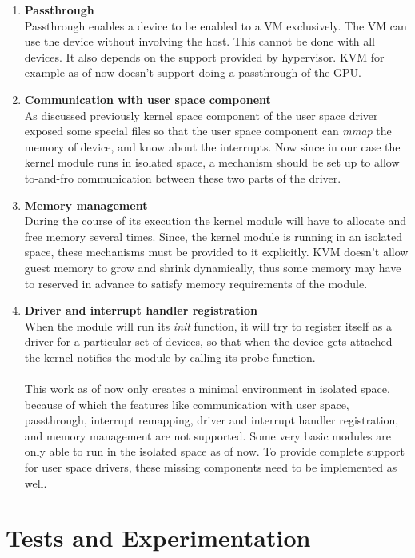 \documentclass[twoside]{iitbreport}
\begin{document}
\begin{enumerate}
\item \textbf{Passthrough}\\
Passthrough enables a device to be enabled to a VM exclusively. The VM can use the device without involving the host. This cannot be done with all devices. It also depends on the support provided by hypervisor. KVM for example as of now doesn't support doing a passthrough of the GPU.
\item \textbf{Communication with user space component}\\
As discussed previously kernel space component of the user space driver exposed some special files so that the user space component can \textit{mmap} the memory of device, and know about the interrupts. Now since in our case the kernel module runs in isolated space, a mechanism should be set up to allow to-and-fro communication between these two parts of the driver.
\item \textbf{Memory management}\\
During the course of its execution the kernel module will have to allocate and free memory several times. Since, the kernel module is running in an isolated space, these mechanisms must be provided to it explicitly. KVM doesn't allow guest memory to grow and shrink dynamically, thus some memory may have to reserved in advance to satisfy memory requirements of the module.
\item \textbf{Driver and interrupt handler registration}\\
When the module will run its \textit{init} function, it will try to register itself as a driver for a particular set of devices, so that when the device gets attached the kernel notifies the module by calling its probe function.\\\\
This work as of now only creates a minimal environment in isolated space, because of which the features like communication with user space, passthrough, interrupt remapping, driver and interrupt handler registration, and memory management are not supported. Some very basic modules are only able to run in the isolated space as of now. To provide complete support for user space drivers, these missing components need to be implemented as well.
\end{enumerate}



\chapter{Tests and Experimentation}
\end{document}
